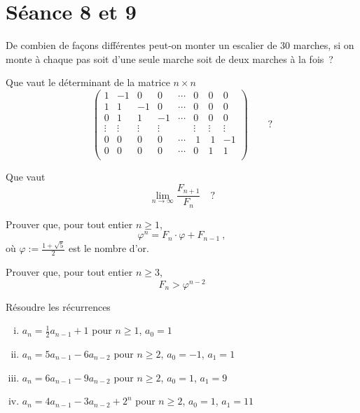 \section{Séance 8 et 9}

\begin{exo}
De combien de fa\c{c}ons diff\'erentes peut-on monter un escalier de 30 marches, si on monte \`a chaque pas soit d'une seule marche soit de deux marches \`a la fois~?
\end{exo}

\begin{exo} 
Que vaut le d\'eterminant de la matrice $n \times n$ 
$$
\left( 
\begin{array}{rrrrrrrr}
1 &-1 &0  &0  &\cdots &0 &0 &0\\
1 & 1 &-1 &0  &\cdots &0 &0 &0\\
0 & 1 &1  &-1 &\cdots &0 &0 &0\\
\vdots & \vdots & \vdots & \vdots && \vdots & \vdots &\vdots\\
0 & 0 & 0 & 0 & \cdots & ~1 &~1 &-1\\
0 & 0 & 0 & 0 & \cdots & 0 &1 &1\\
\end{array}
\right) \qquad ?
$$
\end{exo}

\begin{exo} 
Que vaut
$$
\lim_{n \to \infty} \frac{F_{n+1}}{F_n} \quad ?
$$
\end{exo}

\begin{exo} 
Prouver que, pour tout entier $n \geqslant 1$, 
$$
\varphi^n = F_n \cdot \varphi + F_{n-1}\ ,
$$
o\`u $\varphi := \frac{1+\sqrt{5}}{2}$ est le {\DEF nombre d'or}.
\end{exo}

\begin{exo} 
Prouver que, pour tout entier $n \geqslant 3$,
$$
F_n > \varphi^{n-2}
$$
\end{exo}

\begin{exo}
R\'esoudre les r\'ecurrences 
%
\begin{enumerate}[(i)]
\item $a_n = \frac{1}{2} a_{n-1} + 1$ pour $n \geqslant 1$,\hfill
 $a_0 = 1$

\item $a_n = 5a_{n-1} - 6a_{n-2}$ pour $n \geqslant 2$,\hfill
 $a_0 = -1$, \quad $a_1 = 1$

\item $a_n = 6a_{n-1} - 9a_{n-2}$ pour $n \geqslant 2$,\hfill
 $a_0 = 1$, \quad $a_1 = 9$

\item $a_n = 4a_{n-1} - 3a_{n-2} + 2^n$ pour $n \geqslant 2$,\hfill
$a_0 = 1$, \quad $a_1 = 11$
\end{enumerate}
\end{exo}

